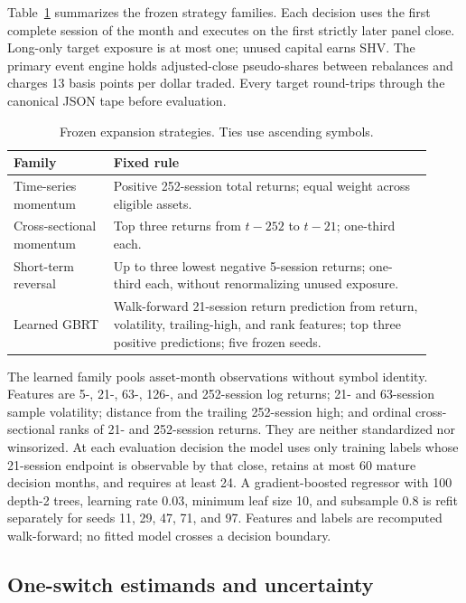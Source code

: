 \documentclass{article}
\begin{document}
Table~\ref{tab:expansion-design} summarizes the frozen strategy families. Each
decision uses the first complete session of the month and executes on the first
strictly later panel close. Long-only target exposure is at most one; unused
capital earns SHV. The primary event engine holds adjusted-close pseudo-shares
between rebalances and charges 13 basis points per dollar traded. Every target
round-trips through the canonical JSON tape before evaluation.

\begin{table}[t]
  \caption{Frozen expansion strategies. Ties use ascending symbols.}
  \label{tab:expansion-design}
  \centering
  \small
  \begin{tabular}{>{\raggedright\arraybackslash}p{0.22\linewidth}
                  >{\raggedright\arraybackslash}p{0.70\linewidth}}
    \toprule
    Family & Fixed rule \\
    \midrule
    Time-series momentum & Positive 252-session total returns; equal weight across eligible assets. \\
    Cross-sectional momentum & Top three returns from $t-252$ to $t-21$; one-third each. \\
    Short-term reversal & Up to three lowest negative 5-session returns; one-third each, without renormalizing unused exposure. \\
    Learned GBRT & Walk-forward 21-session return prediction from return, volatility, trailing-high, and rank features; top three positive predictions; five frozen seeds. \\
    \bottomrule
  \end{tabular}
\end{table}

The learned family pools asset-month observations without symbol identity.
Features are 5-, 21-, 63-, 126-, and 252-session log returns; 21- and 63-session
sample volatility; distance from the trailing 252-session high; and ordinal
cross-sectional ranks of 21- and 252-session returns. They are neither
standardized nor winsorized. At each evaluation decision the model uses only
training labels whose 21-session endpoint is observable by that close, retains
at most 60 mature decision months, and requires at least 24. A gradient-boosted
regressor with 100 depth-2 trees, learning rate 0.03, minimum leaf size 10, and
subsample 0.8 is refit separately for seeds 11, 29, 47, 71, and 97. Features and
labels are recomputed walk-forward; no fitted model crosses a decision boundary.

\subsection{One-switch estimands and uncertainty}
\end{document}
